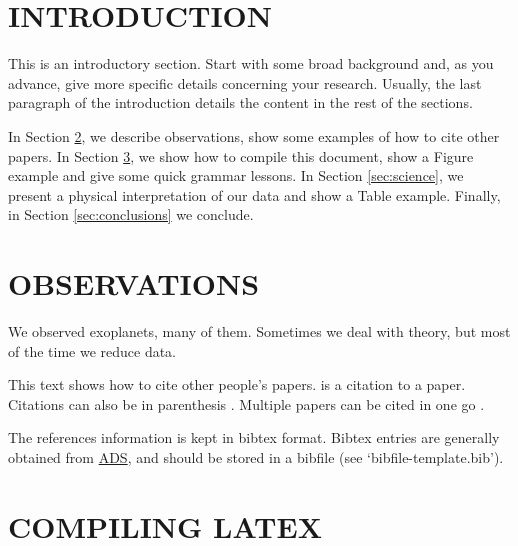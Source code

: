 

\section{INTRODUCTION}
\label{introduction}

This is an introductory section.  Start with some broad background and,
as you advance, give more specific details concerning your research.
Usually, the last paragraph of the introduction details the content in
the rest of the sections.

In Section \ref{sec:observations}, we describe observations, show some
examples of how to cite other papers.  In Section
\ref{sec:compile}, we show how to compile this document, show a Figure
example and give some quick grammar lessons.  In Section
\ref{sec:science}, we present a physical interpretation of our data
and show a Table example.  Finally, in Section \ref{sec:conclusions}
we conclude.

\section{OBSERVATIONS}
\label{sec:observations}

We observed exoplanets, many of them.  Sometimes we deal with theory,
but most of the time we reduce data.

This text shows how to cite other people's papers.
\citet{HarringtonEtal2006sciuandbphas} is a citation to a paper.
Citations can also be in parenthesis
\citep[e.g.,][]{HarringtonEtal2007natHD149026b}.  Multiple papers can
be cited in one go \citep{StevensonEtal2010natGJ436b,
  StevensonEtal2012apjHD149026b, StevensonEtal2012apjGJ436c,
  BlecicEtal2013apjWASP14b, BlecicEtal2014apjWASP43b,
  CubillosEtal2013apjWASP8b, CubillosEtal2014apjTrES1,
  CampoEtal2011apjWASP12b, NymeyerEtal2011apjWASP18b}.

The references information is kept in bibtex format.  Bibtex entries
are generally obtained from
\href{http://adsabs.harvard.edu/abstract_service.html}{ADS}, and
should be stored in a bibfile (see `bibfile-template.bib').


\section{COMPILING LATEX}
\label{sec:compile}

